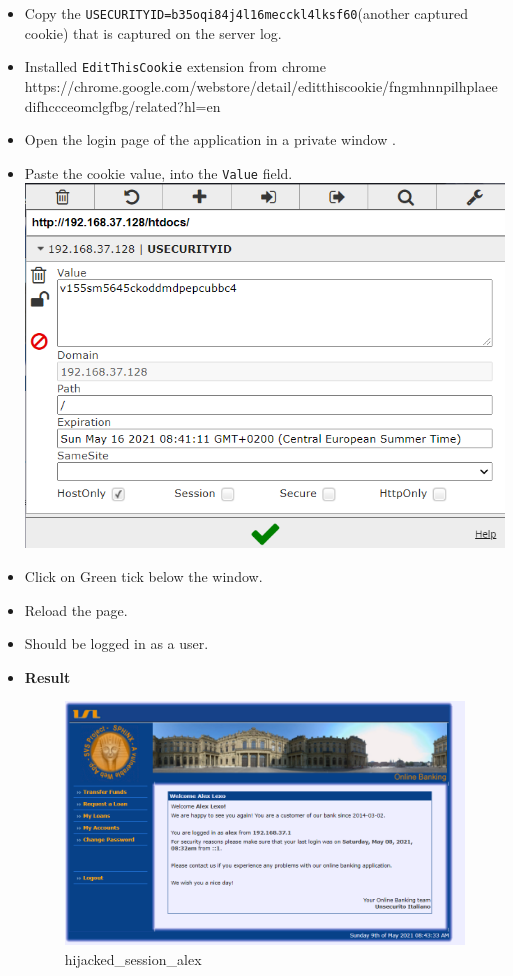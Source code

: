 \begin{itemize}
\item
  Copy the \texttt{USECURITYID=b35oqi84j4l16mecckl4lksf60}(another
  captured cookie) that is captured on the server log.
\item
  Installed \texttt{EditThisCookie} extension from chrome
  https://chrome.google.com/webstore/detail/editthiscookie/fngmhnnpilhplaeedifhccceomclgfbg/related?hl=en
\item
  Open the login page of the application in a private window .
\item
  Paste the cookie value, into the \texttt{Value} field.
  \includegraphics{images/task2/edit_this_cookie.PNG}
\item
  Click on Green tick below the window.
\item
  Reload the page.
\item
  Should be logged in as a user.
\item
  \textbf{Result}

  \begin{figure}
  \centering
  \includegraphics{images/task2/hijacked_session.PNG}
  \caption{hijacked\_session\_alex}
  \end{figure}
\end{itemize}

